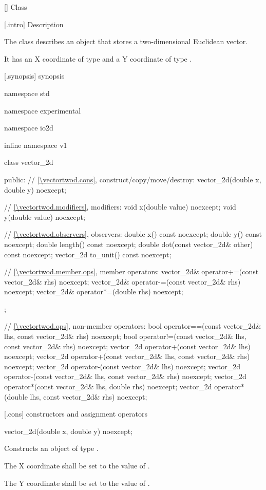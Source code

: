  [\vectortwod] {Class }

 [\vectortwod.intro] { Description}

\pnum
{}
The class  describes an object that stores a two-dimensional Euclidean vector.

\pnum
It has an X coordinate of type  and a Y coordinate of type .

 [\vectortwod.synopsis] { synopsis}

\begin{codeblock}
namespace std { namespace experimental { namespace io2d { inline namespace v1 {
  class vector_2d {
  public:
    // \ref{\vectortwod.cons}, construct/copy/move/destroy:
    vector_2d(double x, double y) noexcept;

    // \ref{\vectortwod.modifiers}, modifiers:
    void x(double value) noexcept;
    void y(double value) noexcept;
    
    // \ref{\vectortwod.observers}, observers:
    double x() const noexcept;
    double y() const noexcept;
    double length() const noexcept;
    double dot(const vector_2d& other) const noexcept;
    vector_2d to_unit() const noexcept;
    
    // \ref{\vectortwod.member.ops}, member operators:
    vector_2d& operator+=(const vector_2d& rhs) noexcept;
    vector_2d& operator-=(const vector_2d& rhs) noexcept;
    vector_2d& operator*=(double rhs) noexcept;
  };
  
  // \ref{\vectortwod.ops}, non-member operators:
  bool operator==(const vector_2d& lhs, const vector_2d& rhs) noexcept;
  bool operator!=(const vector_2d& lhs, const vector_2d& rhs) noexcept;
  vector_2d operator+(const vector_2d& lhs) noexcept;
  vector_2d operator+(const vector_2d& lhs, const vector_2d& rhs) noexcept;
  vector_2d operator-(const vector_2d& lhs) noexcept;
  vector_2d operator-(const vector_2d& lhs, const vector_2d& rhs) noexcept;
  vector_2d operator*(const vector_2d& lhs, double rhs) noexcept;
  vector_2d operator*(double lhs, const vector_2d& rhs) noexcept;
} } } }
\end{codeblock}

 [\vectortwod.cons] { constructors and assignment operators}

\begin{itemdecl}
vector_2d(double x, double y) noexcept;
\end{itemdecl}
\begin{itemdescr}
	\pnum
	\effects
	Constructs an object of type .

	\pnum
	The X coordinate shall be set to the value of .

	\pnum
	The Y coordinate shall be set to the value of .
\end{itemdescr}


